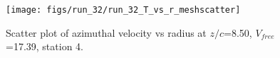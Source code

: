\begin{figure}[H]
\centering
\texttt{[image: figs/run\_32/run\_32\_T\_vs\_r\_meshscatter]}
\caption{Scatter plot of azimuthal velocity vs radius at $z/c$=8.50, $V_{free}$=17.39, station 4.}
\label{fig:run_32_T_vs_r_meshscatter}
\end{figure}


